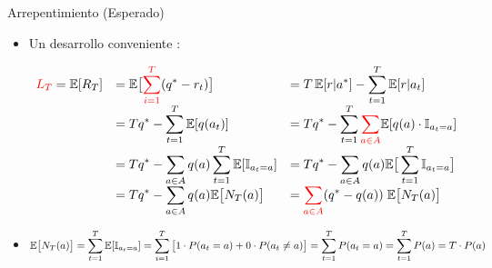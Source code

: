 \documentclass[10pt, envcountsect, handout, aspectratio=1610, hyperref={hypertexnames=true}]{beamer}
\begin{document}
\begin{frame}{Arrepentimiento (Esperado)}

\begin{itemize}
\item Un desarrollo conveniente \citep{bonald2017bandits}: 

$
\begin{array}{rll}
{\color{red} L_T}=\mathbb{E}[R_T] & = \displaystyle \mathbb{E}\big [ {\color{red}\sum_{i=1}^T} (q^*-r_t) \big] &\displaystyle = T \, \mathbb{E}[r|a^*] - \sum_{t=1}^T \mathbb{E}[r|a_t] \\ 
	&\displaystyle = T q^* - \sum_{t=1}^T \mathbb{E}[q(a_t)] 
	 &\displaystyle = T q^* - \sum_{t=1}^T {\color{red} \sum_{a\in A}}\mathbb{E}[q(a) \cdot \mathbb{I}_{a_t=a}] \\
	&\displaystyle = T q^* -  \sum_{a\in A} q(a) \sum_{t=1}^T \mathbb{E}[ \mathbb{I}_{a_t=a}] 
	 &\displaystyle = T q^* -  \sum_{a\in A} q(a) \mathbb{E}\big[ \sum_{t=1}^T \mathbb{I}_{a_t=a} \big] \\
	&\displaystyle = T q^* -  \sum_{a\in A} q(a) \mathbb{E}\big[ N_T(a) \big]
	&\displaystyle = {\color{red} \sum_{a\in A}}  (q^* -  q(a)) \; \mathbb{E}\big[ N_T(a) \big] 
\end{array}
$

\item $\displaystyle \mathbb{E}\big[ N_T(a) \big]=\sum_{t=1}^T \mathbb{E}[ \mathbb{I}_{a_t=a}]=\sum_{i=1}^T \big[ 1\cdot P(a_t=a) + 0\cdot P(a_t\not=a) \big]= \sum_{t=1}^T P(a_t=a) = \sum_{t=1}^T P(a) = T \cdot P(a) $


\end{itemize}	

\end{frame}



\end{document}
